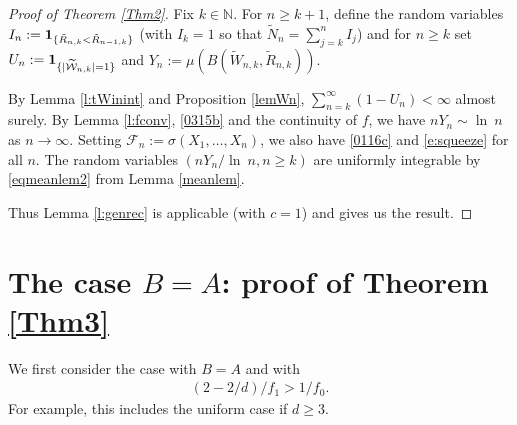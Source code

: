 \documentclass[12pt]{article}
\newcommand{\N}{\mathbb{N}}
\newcommand{\tcW}{\widetilde{\mathcal{W}}}
\newcommand{\tW}{\tilde{W}}
\newcommand{\cF}{\mathcal{F}}
\newcommand{\tN}{{\tilde{N}}}
\newcommand{\tR}{{\tilde{R}}}
\renewcommand{\log}{{\ln \:}}
\newcommand{\eqco}{\setcounter{equation}{0}}
\newcommand{\thco}{\setcounter{theo}{0}}
\newcommand{\prco}{\setcounter{prop}{0}}
\newcommand{\laco}{\setcounter{lemm}{0}}
\newcommand{\coco}{\setcounter{coro}{0}}
\newcommand{\cjco}{\setcounter{conj}{0}}
\newcommand{\deco}{\setcounter{defn}{0}}
\newcommand{\allco}{\eqco  \thco \prco \laco \coco \cjco \deco}
\begin{document}
\begin{proof}[Proof of Theorem \ref{Thm2}]
	Fix $k \in \N$.
For $n \geq k+1$, define the random variables $I_n := {\bf 1}_{\{\tR_{n,k}
< \tR_{n-1,k}\}}$ (with $I_k =1$ so that $\tN_n= \sum_{j = k}^n I_j$) and
for $n \geq k$ set
	$U_n := {\bf 1}_{\{|\tcW_{n,k}|=1\}}$ and
 $Y_n := \mu(B(\tW_{n,k},\tR_{n,k}))$.

	By Lemma \ref{l:tWinint}
and Proposition \ref{lemWn}, $\sum_{n = k}^\infty (1- U_n) < \infty$ 
almost surely.
	By Lemma \ref{l:fconv}, \eqref{0315b}
	and the continuity of $f$, we have 
	$n Y_n \sim \log n$ as $n \to \infty$.
	Setting $\cF_n := \sigma(X_1,\ldots,X_n)$,
	we also have \eqref{0116c} and \eqref{e:squeeze} for all $n$.
	The random variables $(nY_n/\log n, n \geq k)$
	are uniformly integrable by \eqref{eqmeanlem2} from Lemma \ref{meanlem}.

	Thus Lemma \ref{l:genrec} is applicable (with $c=1$) and
	gives us the result.
\end{proof}




\section{The case $B=A$: proof of Theorem \ref{Thm3}}
\allco
We first consider the case with $B=A$ and with 
\begin{align}
(2 -2/d)/ f_1 > 1/f_0.
	\label{e:bdydom}
\end{align}
For example, this includes the uniform case if $d \geq 3$.
\end{document}
